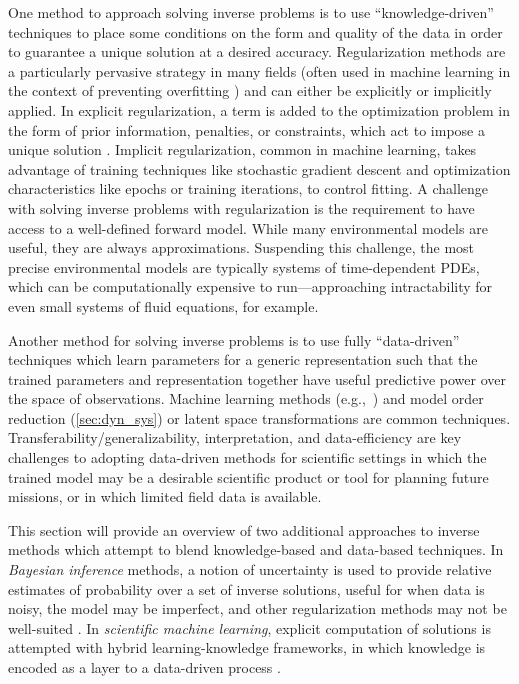 One method to approach solving inverse problems is to use ``knowledge-driven'' techniques to place some conditions on the form and quality of the data in order to guarantee a unique solution at a desired accuracy. Regularization methods are a particularly pervasive strategy in many fields (often used in machine learning in the context of preventing overfitting \autocite{srivastava2014dropout}) and can either be explicitly or implicitly applied. In explicit regularization, a term is added to the optimization problem in the form of prior information, penalties, or constraints, which act to impose a unique solution \autocite{engl1996regularization,benning2018modern,iglesias2013ensemble}. Implicit regularization, common in machine learning, takes advantage of training techniques like stochastic gradient descent \autocite{bottou2010large,amari1993backpropagation} and optimization characteristics like epochs or training iterations, to control fitting. A challenge with solving inverse problems with regularization is the requirement to have access to a well-defined forward model. While many environmental models are useful, they are always approximations. Suspending this challenge, the most precise environmental models are typically systems of time-dependent PDEs, which can be computationally expensive to run---approaching intractability for even small systems of fluid equations, for example.

Another method for solving inverse problems is to use fully ``data-driven'' techniques which learn parameters for a generic representation such that the trained parameters and representation together have useful predictive power over the space of observations. Machine learning methods (e.g.,~\cite{lu2020extracting,follmann2019predicting,blanchard2019learning,chen2019presentation,pathak2018model}) and model order reduction (\cref{sec:dyn_sys}) or latent space transformations \autocite{bigoni2019greedy,spantini2018inference} are common techniques. Transferability/generalizability, interpretation, and data-efficiency are key challenges to adopting data-driven methods for scientific settings in which the trained model may be a desirable scientific product or tool for planning future missions, or in which limited field data is available.

This section will provide an overview of two additional approaches to inverse methods which attempt to blend knowledge-based and data-based techniques. In \emph{Bayesian inference} methods, a notion of uncertainty is used to provide relative estimates of probability over a set of inverse solutions, useful for when data is noisy, the model may be imperfect, and other regularization methods may not be well-suited \autocite{stuart2010inverse}. In \emph{scientific machine learning}, explicit computation of solutions is attempted with hybrid learning-knowledge frameworks, in which knowledge is encoded as a layer to a data-driven process \autocite{baker2019workshop}.


